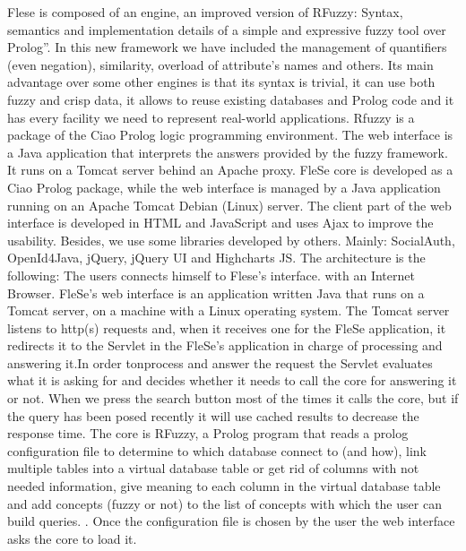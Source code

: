 \documentclass[a4paper,twoside]{article}
\begin{document}
Flese is composed of an engine, an improved version of RFuzzy: Syntax, semantics and implementation details of a simple and expressive fuzzy tool over Prolog”. In this new framework we have included the management of quantifiers (even negation), similarity, overload of attribute's names and others. 
Its main advantage over some other engines is that its syntax is trivial, it can use both fuzzy and crisp data, it allows to reuse existing databases and Prolog code and it has every facility we need to represent real-world applications. Rfuzzy is a package of the Ciao Prolog logic programming environment. 
The web interface is a Java application that interprets the answers provided by the fuzzy framework. It runs on a Tomcat server behind an Apache proxy. 
FleSe core is developed as a Ciao Prolog package, while the web interface is managed by a Java application running on an Apache Tomcat Debian (Linux) server. The client part of the web interface is developed in HTML and JavaScript and uses Ajax to improve the usability. Besides, we use some libraries developed by others. Mainly: SocialAuth, OpenId4Java, jQuery, jQuery UI and Highcharts JS.
The architecture is the following:
The users connects himself to Flese's interface. with an Internet Browser. FleSe’s web interface is an application written Java that runs on a Tomcat server, on a machine with a Linux operating system. The Tomcat server listens to http(s) requests and, when it receives one for the FleSe application, it redirects it to the Servlet in the FleSe’s application in charge of processing and answering it.In order tonprocess and answer the request the Servlet evaluates what it is asking for and decides whether it needs to call the core for answering it or not. When we
press the search button most of the times it calls the core, but if the query has been posed recently it will use cached results to decrease the response time. The core is RFuzzy, a Prolog program that reads a prolog configuration file to determine to which database connect to (and how),  link multiple tables into a virtual database table or get rid of columns with not needed information, give meaning to each column in the virtual database table and add concepts (fuzzy or not) to the list of concepts with which the user can build queries. . Once the configuration file is chosen by the user the web interface asks the core to load it.
\end{document}
